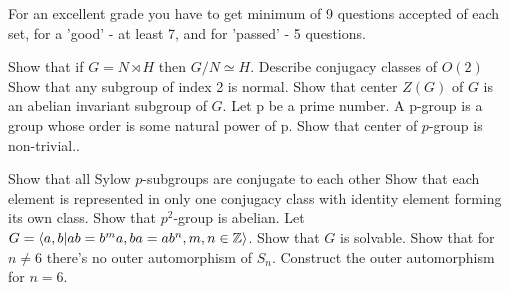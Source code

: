 \documentclass[12pt]{article}
\begin{document}
	
		For an excellent grade you have to get minimum of 9 questions accepted  of each set, for a 'good' - at least 7, and for 'passed' - 5 questions.	
	
	\p
	Show that if $G=N \rtimes H$ then $ G/N \simeq H$.
	\ep
	\p
	Describe conjugacy classes of $O(2)$
	\ep
	\p 
	Show that any subgroup of index 2 is normal.
	\ep
	\p Show that center $Z(G)$ of $G$ is an abelian invariant subgroup of $G$.
	\ep
	\df
   Let p be a prime number. A p-group is a group whose order is some natural power of p.
	\edf
	\p Show that center of $p$-group is non-trivial..
	\ep

	
	\p Show that all Sylow $p$-subgroups are conjugate to each other
	\ep
	\p Show that each element is represented in only one conjugacy class with identity element forming its own class.
	\ep
	\p
	Show that $p^2$-group is abelian.
	\ep
	\p Let $G = \langle a,b | ab=b^m a, ba = ab^n, m,n \in {\mathbb Z} \rangle$. Show that $G$ is solvable.
	\ep
	\p Show that for $n \neq 6$ there's no outer automorphism of  $S_n$. Construct the outer automorphism for $n=6$.
	\ep

	
\end{document}
